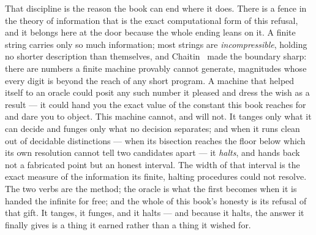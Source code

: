That discipline is the reason the book can end where it does. There is a fence in the theory of information that is the
exact computational form of this refusal, and it belongs here at the door because the whole ending leans on it. A
finite string carries only so much information; most strings are \emph{incompressible}, holding no shorter description
than themselves, and Chaitin~\cite{chaitin1974} made the boundary sharp: there are numbers a finite machine provably
cannot generate, magnitudes whose every digit is beyond the reach of any short program. A machine that helped itself
to an oracle could posit any such number it pleased and dress the wish as a result --- it could hand you the exact
value of the constant this book reaches for and dare you to object. This machine cannot, and will not. It tanges only
what it can decide and funges only what no decision separates; and when it runs clean out of decidable distinctions ---
when its bisection reaches the floor below which its own resolution cannot tell two candidates apart --- it
\emph{halts}, and hands back not a fabricated point but an honest interval. The width of that interval is the exact
measure of the information its finite, halting procedures could not resolve. The two verbs are the method; the oracle
is what the first becomes when it is handed the infinite for free; and the whole of this book's honesty is its refusal
of that gift. It tanges, it funges, and it halts --- and because it halts, the answer it finally gives is a thing it
earned rather than a thing it wished for.
